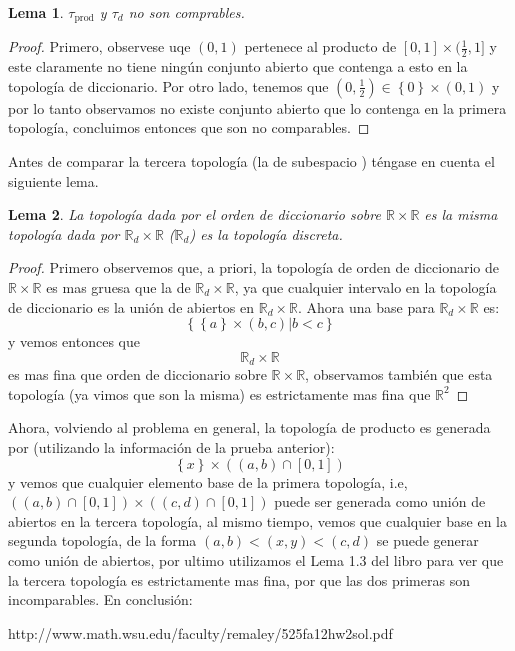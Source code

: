\documentclass[notitlepage]{article}
\newtheorem{lem}{Lema}
\newcommand{\set}[1]{\left\lbrace #1 \right\rbrace}
\newcommand{\RR}{\mathbb{R}}
\newcommand{\qt}[1]{\textrm{#1}}
\begin{document}
\begin{lem}
	$ \tau_{\qt{prod}} $ y $\tau_d$ no son comprables.
\end{lem}
\begin{proof}
	Primero, observese uqe $(0,1) $ pertenece al producto de $ [0,1] \times (\frac{1}{2},1] $ y este claramente no tiene ningún conjunto abierto que contenga  a esto en la topología de diccionario. Por otro lado, tenemos que $(0,\frac{1}{2}) \in \set{0} \times (0,1) $ y por lo tanto observamos no existe conjunto abierto que lo contenga en la primera topología, concluimos entonces que son no comparables.
\end{proof}
Antes de comparar la tercera topología (la de subespacio ) téngase en cuenta el siguiente lema.
\begin{lem}
	La topología dada por el orden de diccionario sobre $ \RR \times \RR $ es la misma topología dada por $ \RR_d \times \RR$ ($\RR_d$) es la topología discreta. 
\end{lem}
\begin{proof}
	Primero observemos que, a priori, la topología de orden de diccionario de $ \RR \times \RR$ es mas gruesa que la de  $ \RR_d \times \RR$, ya que cualquier intervalo en la topología de diccionario es la unión de abiertos en $ \RR_d \times \RR$. Ahora una base para $ \RR_d \times \RR$ es:
	\[ \set{\set{a} \times (b,c) | b<c} \] y vemos entonces que $$ \RR_d \times \RR$$ es mas fina que orden de diccionario sobre $ \RR \times \RR $, observamos también que esta topología (ya vimos que son la misma) es estrictamente mas fina que $ \RR^2$
\end{proof}

Ahora, volviendo al problema en general, la topología de producto es generada por (utilizando la información de la prueba anterior):
\[ \set{x} \times ((a,b) \cap [0,1]) \]
y vemos que cualquier elemento base de la primera topología, i.e, $ ((a,b) \cap [0,1]) \times ((c,d) \cap [0,1]) $ puede ser generada como unión de abiertos en la tercera topología, al mismo tiempo, vemos que cualquier base en la segunda topología, de la forma $(a,b) < (x,y) < (c,d) $ se puede generar como unión de abiertos, por ultimo utilizamos el Lema 1.3 del libro para ver que la tercera topología es estrictamente mas fina, por que las dos primeras son incomparables. En conclusión:

http://www.math.wsu.edu/faculty/remaley/525fa12hw2sol.pdf
\end{document}
